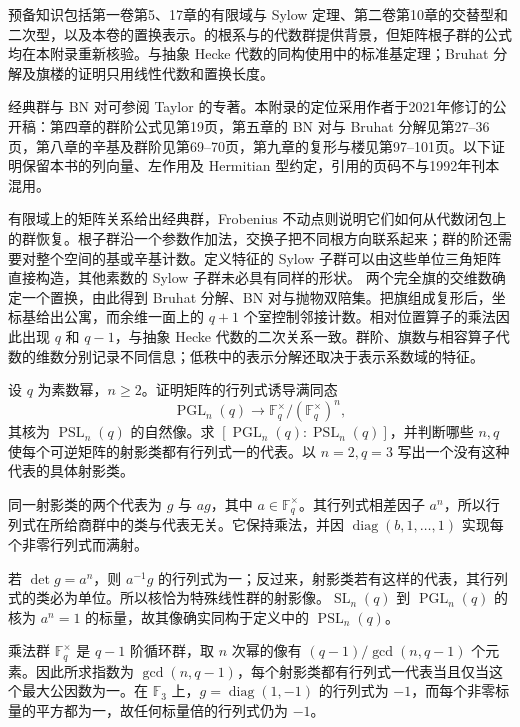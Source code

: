 \ProseParagraphBreak
预备知识包括第一卷第5、17章的有限域与 Sylow 定理、第二卷第10章的交替型和二次型，以及本卷的置换表示。的根系与的代数群提供背景，但矩阵根子群的公式均在本附录重新核验。与抽象 Hecke 代数的同构使用中的标准基定理；Bruhat 分解及旗楼的证明只用线性代数和置换长度。

\ProseParagraphBreak
经典群与 BN 对可参阅 Taylor 的专著\cite{Taylor1992ClassicalGroups}。本附录的定位采用作者于2021年修订的公开稿：第四章的群阶公式见第19页，第五章的 BN 对与 Bruhat 分解见第27--36页，第八章的辛基及群阶见第69--70页，第九章的复形与楼见第97--101页。以下证明保留本书的列向量、左作用及 Hermitian 型约定，引用的页码不与1992年刊本混用。






\begin{chaptersummary}
	有限域上的矩阵关系给出经典群，Frobenius 不动点则说明它们如何从代数闭包上的群恢复。根子群沿一个参数作加法，交换子把不同根方向联系起来；群的阶还需要对整个空间的基或辛基计数。定义特征的 Sylow 子群可以由这些单位三角矩阵直接构造，其他素数的 Sylow 子群未必具有同样的形状。
	\ProseParagraphBreak
	两个完全旗的交维数确定一个置换，由此得到 Bruhat 分解、BN 对与抛物双陪集。把旗组成复形后，坐标基给出公寓，而余维一面上的 \(q+1\) 个室控制邻接计数。相对位置算子的乘法因此出现 \(q\) 和 \(q-1\)，与抽象 Hecke 代数的二次关系一致。群阶、旗数与相容算子代数的维数分别记录不同信息；低秩中的表示分解还取决于表示系数域的特征。
\end{chaptersummary}

\BookExercises

\begin{exercise}\label{b5:ex:F-projective-determinant}
	设 \(q\) 为素数幂，\(n\ge2\)。证明矩阵的行列式诱导满同态
	\[
		\operatorname{PGL}_n(q)\longrightarrow
		\mathbb F_q^\times/(\mathbb F_q^\times)^n,
	\]
	其核为 \(\operatorname{PSL}_n(q)\) 的自然像。求 \([\operatorname{PGL}_n(q):\operatorname{PSL}_n(q)]\)，并判断哪些 \(n,q\) 使每个可逆矩阵的射影类都有行列式一的代表。以 \(n=2,q=3\) 写出一个没有这种代表的具体射影类。
\end{exercise}
\begin{solution}
	同一射影类的两个代表为 \(g\) 与 \(ag\)，其中 \(a\in\mathbb F_q^\times\)。其行列式相差因子 \(a^n\)，所以行列式在所给商群中的类与代表无关。它保持乘法，并因 \(\operatorname{diag}(b,1,\ldots,1)\) 实现每个非零行列式而满射。

	若 \(\det g=a^n\)，则 \(a^{-1}g\) 的行列式为一；反过来，射影类若有这样的代表，其行列式的类必为单位。所以核恰为特殊线性群的射影像。\(\operatorname{SL}_n(q)\) 到 \(\operatorname{PGL}_n(q)\) 的核为 \(a^n=1\) 的标量，故其像确实同构于定义中的 \(\operatorname{PSL}_n(q)\)。

	乘法群 \(\mathbb F_q^\times\) 是 \(q-1\) 阶循环群，取 \(n\) 次幂的像有 \((q-1)/\gcd(n,q-1)\) 个元素。因此所求指数为 \(\gcd(n,q-1)\)，每个射影类都有行列式一代表当且仅当这个最大公因数为一。在 \(\mathbb F_3\) 上，\(g=\operatorname{diag}(1,-1)\) 的行列式为 \(-1\)，而每个非零标量的平方都为一，故任何标量倍的行列式仍为 \(-1\)。
\end{solution}

